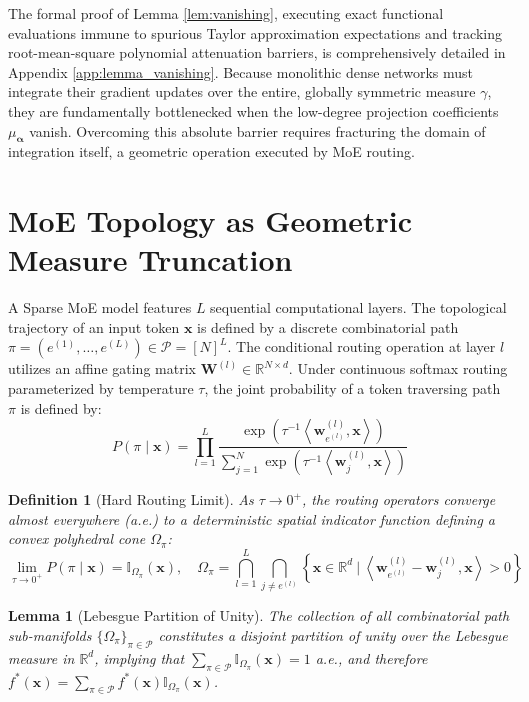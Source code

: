 \documentclass{article}
\newcommand{\R}{\mathbb{R}}
\newcommand{\1}{\mathbb{I}}
\newcommand{\inner}[2]{\left\langle#1, #2\right\rangle}
\newcommand{\calP}{\mathcal{P}}
\newcommand{\bx}{\mathbf{x}}
\newcommand{\bw}{\mathbf{w}}
\newcommand{\balpha}{\boldsymbol{\alpha}}
\newcommand{\bW}{\mathbf{W}}
\newtheorem{lemma}[theorem]{Lemma}
\newtheorem{definition}[theorem]{Definition}
\begin{document}
The formal proof of Lemma \ref{lem:vanishing}, executing exact functional evaluations immune to spurious Taylor approximation expectations and tracking root-mean-square polynomial attenuation barriers, is comprehensively detailed in Appendix \ref{app:lemma_vanishing}. Because monolithic dense networks must integrate their gradient updates over the entire, globally symmetric measure $\gamma$, they are fundamentally bottlenecked when the low-degree projection coefficients $\mu_{\balpha}$ vanish. Overcoming this absolute barrier requires fracturing the domain of integration itself, a geometric operation executed by MoE routing.

\section{MoE Topology as Geometric Measure Truncation}
\label{sec:routing}

A Sparse MoE model features $L$ sequential computational layers. The topological trajectory of an input token $\bx$ is defined by a discrete combinatorial path $\pi = (e^{(1)}, \dots, e^{(L)}) \in \calP = [N]^L$. The conditional routing operation at layer $l$ utilizes an affine gating matrix $\bW^{(l)} \in \R^{N \times d}$. Under continuous softmax routing parameterized by temperature $\tau$, the joint probability of a token traversing path $\pi$ is defined by:
\begin{equation} \label{eq:routing_prob}
    P(\pi \mid \bx) = \prod_{l=1}^L \frac{\exp(\tau^{-1} \inner{\bw_{e^{(l)}}^{(l)}}{\bx})}{\sum_{j=1}^N \exp(\tau^{-1} \inner{\bw_{j}^{(l)}}{\bx})}
\end{equation}

\begin{definition}[Hard Routing Limit] \label{def:hard_routing}
As $\tau \to 0^+$, the routing operators converge almost everywhere (a.e.) to a deterministic spatial indicator function defining a convex polyhedral cone $\Omega_\pi$:
\begin{equation}
    \lim_{\tau \to 0^+} P(\pi \mid \bx) = \1_{\Omega_\pi}(\bx), \quad \Omega_\pi = \bigcap_{l=1}^L \bigcap_{j \neq e^{(l)}} \left\{ \bx \in \R^d \ \Big| \ \inner{\bw_{e^{(l)}}^{(l)} - \bw_j^{(l)}}{\bx} > 0 \right\}
\end{equation}
\end{definition}

\begin{lemma}[Lebesgue Partition of Unity] \label{lem:partition}
The collection of all combinatorial path sub-manifolds $\{\Omega_\pi\}_{\pi \in \calP}$ constitutes a disjoint partition of unity over the Lebesgue measure in $\R^d$, implying that $\sum_{\pi \in \calP} \1_{\Omega_\pi}(\bx) = 1$ a.e., and therefore $f^*(\bx) = \sum_{\pi \in \calP} f^*(\bx) \1_{\Omega_\pi}(\bx)$.
\end{lemma}
\end{document}
